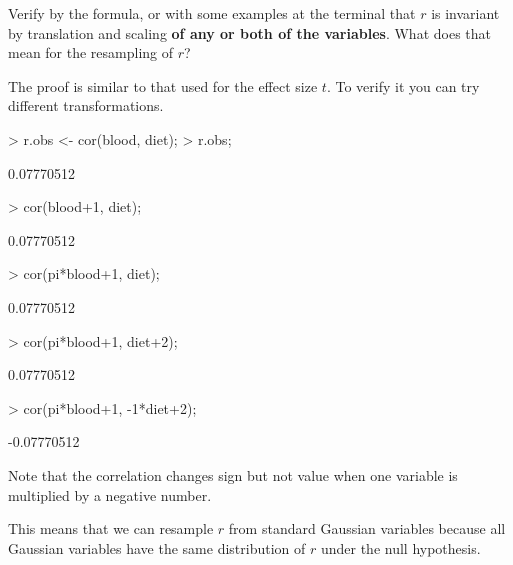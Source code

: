 \documentclass[a4paper]{article}
\theoremstyle{definition}
\begin{document}
\begin{Exercise}
Verify by the formula, or with some examples at the terminal that $r$
is invariant by translation and scaling \textbf{of any or both of the
variables}. What does that mean for the resampling of $r$?
\end{Exercise}
\begin{Answer}
The proof is similar to that used for the effect size $t$. To verify
it you can try different transformations.
\begin{Schunk}
\begin{Sinput}
> r.obs <- cor(blood, diet);
> r.obs;
\end{Sinput}
\begin{Soutput}
[1] 0.07770512
\end{Soutput}
\begin{Sinput}
> cor(blood+1, diet);
\end{Sinput}
\begin{Soutput}
[1] 0.07770512
\end{Soutput}
\begin{Sinput}
> cor(pi*blood+1, diet);
\end{Sinput}
\begin{Soutput}
[1] 0.07770512
\end{Soutput}
\begin{Sinput}
> cor(pi*blood+1, diet+2);
\end{Sinput}
\begin{Soutput}
[1] 0.07770512
\end{Soutput}
\begin{Sinput}
> cor(pi*blood+1, -1*diet+2);
\end{Sinput}
\begin{Soutput}
[1] -0.07770512
\end{Soutput}
\end{Schunk}
\par
Note that the correlation changes sign but not value when one variable
is multiplied by a negative number.

This means that we can resample $r$ from standard Gaussian variables
because all Gaussian variables have the same distribution of $r$ under
the null hypothesis.
\end{Answer}
\end{document}
